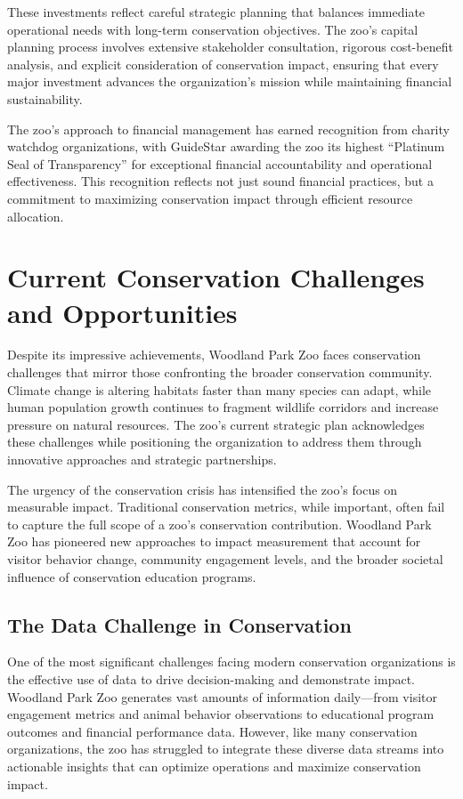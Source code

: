\documentclass[
  Letterpaper,
]{scrbook}
\begin{document}
These investments reflect careful strategic planning that balances
immediate operational needs with long-term conservation objectives. The
zoo's capital planning process involves extensive stakeholder
consultation, rigorous cost-benefit analysis, and explicit consideration
of conservation impact, ensuring that every major investment advances
the organization's mission while maintaining financial sustainability.

The zoo's approach to financial management has earned recognition from
charity watchdog organizations, with GuideStar awarding the zoo its
highest ``Platinum Seal of Transparency'' for exceptional financial
accountability and operational effectiveness. This recognition reflects
not just sound financial practices, but a commitment to maximizing
conservation impact through efficient resource allocation.

\section{Current Conservation Challenges and
Opportunities}\label{current-conservation-challenges-and-opportunities}

Despite its impressive achievements, Woodland Park Zoo faces
conservation challenges that mirror those confronting the broader
conservation community. Climate change is altering habitats faster than
many species can adapt, while human population growth continues to
fragment wildlife corridors and increase pressure on natural resources.
The zoo's current strategic plan acknowledges these challenges while
positioning the organization to address them through innovative
approaches and strategic partnerships.

The urgency of the conservation crisis has intensified the zoo's focus
on measurable impact. Traditional conservation metrics, while important,
often fail to capture the full scope of a zoo's conservation
contribution. Woodland Park Zoo has pioneered new approaches to impact
measurement that account for visitor behavior change, community
engagement levels, and the broader societal influence of conservation
education programs.

\subsection{The Data Challenge in
Conservation}\label{the-data-challenge-in-conservation}

One of the most significant challenges facing modern conservation
organizations is the effective use of data to drive decision-making and
demonstrate impact. Woodland Park Zoo generates vast amounts of
information daily---from visitor engagement metrics and animal behavior
observations to educational program outcomes and financial performance
data. However, like many conservation organizations, the zoo has
struggled to integrate these diverse data streams into actionable
insights that can optimize operations and maximize conservation impact.
\end{document}
